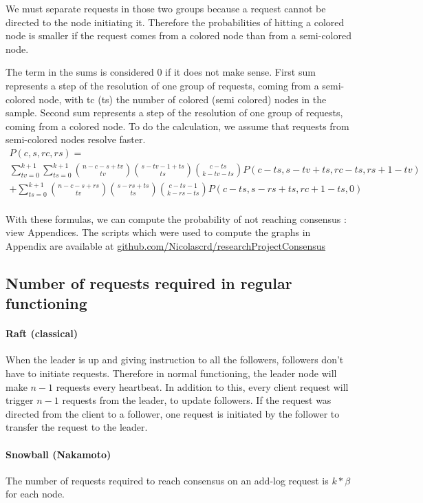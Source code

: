\documentclass[11pt, twocolumn]{article}
\begin{document}
We must separate requests in those two groups because a request cannot be directed to the node initiating it.
Therefore the probabilities of hitting a colored node is smaller if the request comes from a colored node than from a semi-colored node.

The term in the sums is considered 0 if it does not make sense.
First sum represents a step of the resolution of one group of requests, coming from a semi-colored node, with tc (ts) the number of colored (semi colored) nodes in the sample.
Second sum represents a step of the resolution of one group of requests, coming from a colored node.
To do the calculation, we assume that requests from semi-colored nodes resolve faster.
\begin{multline*}
    P(c, s, rc, rs) = \\ \sum_{tv=0}^{k+1}\sum_{ts=0}^{k+1} {n-c-s+tv \choose tv}{s-tv-1+ts \choose ts}{c-ts \choose k-tv-ts}P(c-ts, s-tv+ts, rc-ts, rs+1-tv)
    \\ + \sum_{ts=0}^{k+1} {n-c-s+rs \choose tv}{s-rs+ts \choose ts}{c-ts-1 \choose k-rs-ts}P(c-ts, s-rs+ts, rc+1-ts, 0)
\end{multline*}
\\
With these formulas, we can compute the probability of not reaching consensus : view Appendices.
The scripts which were used to compute the graphs in Appendix are available at \href{https://github.com/Nicolascrd/researchProjectConsensus}{github.com/Nicolascrd/researchProjectConsensus}

\subsection{Number of requests required in regular functioning}

\paragraph{Raft (classical)}
When the leader is up and giving instruction to all the followers, followers don't have to initiate requests.
Therefore in normal functioning, the leader node will make $n-1$ requests every heartbeat.
In addition to this, every client request will trigger $n-1$ requests from the leader, to update followers. If the request was directed from the client to a follower, one request is initiated
by the follower to transfer the request to the leader.

\paragraph{Snowball (Nakamoto)}
The number of requests required to reach consensus on an add-log request is $k*\beta$ for each node.
\end{document}
